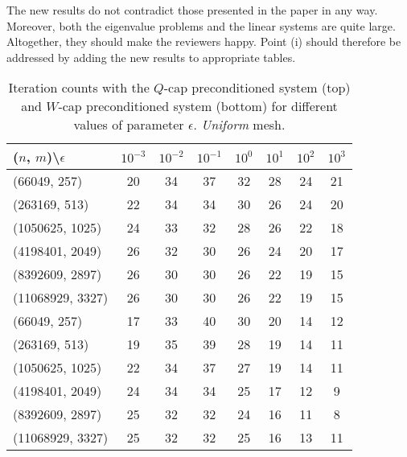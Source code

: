 \documentclass[10pt, a4paper]{article}
\begin{document}
The new results do not contradict those presented in the paper in any way. Moreover, 
both the eigenvalue problems and the linear systems are quite large. Altogether, 
they should make the reviewers happy. Point (i) should therefore be addressed by 
adding the new results to appropriate tables.
\begin{table}[ht]
  \caption{Iteration counts with the $Q$-cap preconditioned system (top) and $W$-cap 
  preconditioned system (bottom) for different values of parameter $\epsilon$. 
  \textit{Uniform} mesh.
}
\label{tab:iter_unif}
\footnotesize{
\begin{tabular}{l|ccccccc}
\hline
($n$, $m$)\textbackslash $\epsilon$ & $10^{-3}$ & $10^{-2}$ & $10^{-1}$ & $10^{0}$ & $10^{1}$ & $10^{2}$ & $10^{3}$\\
\hline
(66049, 257) & 20 & 34 & 37 & 32 & 28 & 24 & 21\\
(263169, 513) & 22 & 34 & 34 & 30 & 26 & 24 & 20\\
(1050625, 1025) & 24 & 33 & 32 & 28 & 26 & 22 & 18\\
(4198401, 2049) & 26 & 32 & 30 & 26 & 24 & 20 & 17\\
(8392609, 2897) & 26 & 30 & 30 & 26 & 22 & 19 & 15\\
(11068929, 3327) & 26 & 30 & 30 & 26 & 22 & 19 & 15\\
\hline
\hline
(66049, 257) & 17 & 33 & 40 & 30 & 20 & 14 & 12\\
(263169, 513) & 19 & 35 & 39 & 28 & 19 & 14 & 11\\
(1050625, 1025) & 22 & 34 & 37 & 27 & 19 & 14 & 11\\
(4198401, 2049) & 24 & 34 & 34 & 25 & 17 & 12 & 9\\
(8392609, 2897) & 25 & 32 & 32 & 24 & 16 & 11 & 8\\
(11068929, 3327) & 25 & 32 & 32 & 25 & 16 & 13 & 11\\
\hline
\end{tabular}
}
\end{table}
%
\end{document}
